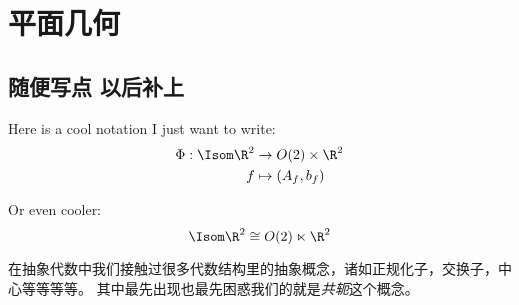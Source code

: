 \chapter{平面几何}

\section{随便写点 以后补上}
Here is a cool notation I just want to write:
\begin{align*}
    \Phi:\Isom \R^{2} &\to O(2) \times \R^{2} \\
    f &\mapsto (A_{f}, b_{f}) \\
\end{align*}

Or even cooler:
\[
    \Isom \R^{2} \cong O(2) \ltimes \R^{2}
\]

在抽象代数中我们接触过很多代数结构里的抽象概念，诸如正规化子，交换子，中心等等等等。
其中最先出现也最先困惑我们的就是\emph{共轭}这个概念。

